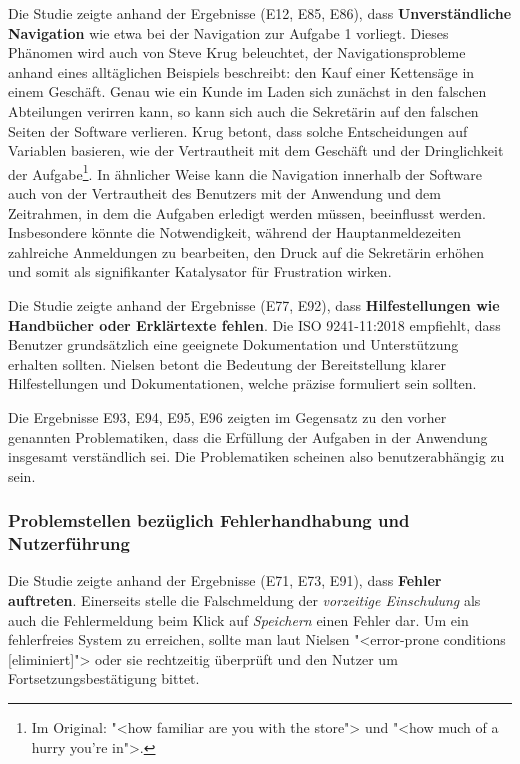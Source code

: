 Die Studie zeigte anhand der Ergebnisse (E12, E85, E86), dass \textbf{Unverständliche Navigation} wie etwa bei der Navigation zur Aufgabe 1 vorliegt. Dieses Phänomen wird auch von Steve Krug beleuchtet, der Navigationsprobleme anhand eines alltäglichen Beispiels beschreibt: den Kauf einer Kettensäge in einem Geschäft. Genau wie ein Kunde im Laden sich zunächst in den falschen Abteilungen verirren kann, so kann sich auch die Sekretärin auf den falschen Seiten der Software verlieren. Krug betont, dass solche Entscheidungen auf Variablen basieren, wie der Vertrautheit mit dem Geschäft und der Dringlichkeit der Aufgabe\footnote{Im Original: "<how familiar are you with the store"> und "<how much of a hurry you're in">.}.\cite{krug} In ähnlicher Weise kann die Navigation innerhalb der Software auch von der Vertrautheit des Benutzers mit der Anwendung und dem Zeitrahmen, in dem die Aufgaben erledigt werden müssen, beeinflusst werden. Insbesondere könnte die Notwendigkeit, während der Hauptanmeldezeiten zahlreiche Anmeldungen zu bearbeiten, den Druck auf die Sekretärin erhöhen und somit als signifikanter Katalysator für Frustration wirken.

Die Studie zeigte anhand der Ergebnisse (E77, E92), dass \textbf{Hilfestellungen wie Handbücher oder Erklärtexte fehlen}. Die ISO 9241-11:2018 empfiehlt, dass Benutzer grundsätzlich eine geeignete Dokumentation und Unterstützung erhalten sollten.\cite{ISO9241-11} Nielsen betont die Bedeutung der Bereitstellung klarer Hilfestellungen und Dokumentationen, welche präzise formuliert sein sollten.\cite{Nielsen10}

Die Ergebnisse E93, E94, E95, E96 zeigten im Gegensatz zu den vorher genannten Problematiken, dass die Erfüllung der Aufgaben in der Anwendung insgesamt verständlich sei. Die Problematiken scheinen also benutzerabhängig zu sein.

\subsubsection{Problemstellen bezüglich Fehlerhandhabung und Nutzerführung}
Die Studie zeigte anhand der Ergebnisse (E71, E73, E91), dass \textbf{Fehler auftreten}. Einerseits stelle die Falschmeldung der \textit{vorzeitige Einschulung} als auch die Fehlermeldung beim Klick auf \textit{Speichern} einen Fehler dar. Um ein fehlerfreies System zu erreichen, sollte man laut Nielsen "<error-prone conditions [eliminiert]"> oder sie rechtzeitig überprüft und den Nutzer um Fortsetzungsbestätigung bittet. \cite{Nielsen10} 

